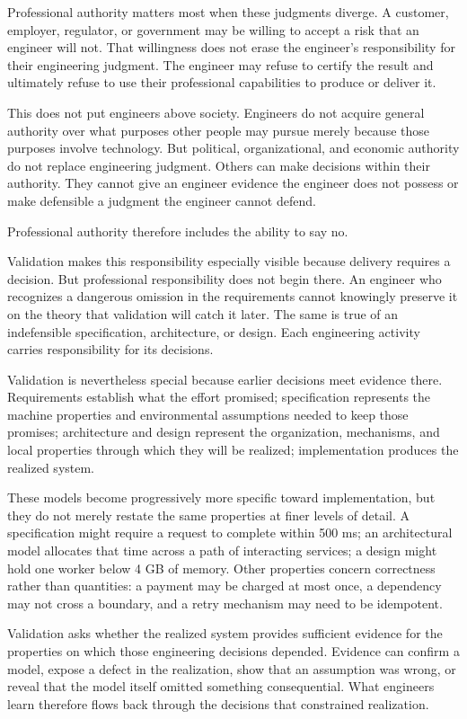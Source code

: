 Professional authority matters most when these judgments diverge. A customer, employer, regulator,
or government may be willing to accept a risk that an engineer will not. That willingness does not
erase the engineer's responsibility for their engineering judgment. The engineer may refuse to
certify the result and ultimately refuse to use their professional capabilities to produce or
deliver it.

This does not put engineers above society. Engineers do not acquire general authority over what
purposes other people may pursue merely because those purposes involve technology. But political,
organizational, and economic authority do not replace engineering judgment. Others can make
decisions within their authority. They cannot give an engineer evidence the engineer does not
possess or make defensible a judgment the engineer cannot defend.

Professional authority therefore includes the ability to say no.

Validation makes this responsibility especially visible because delivery requires a decision. But
professional responsibility does not begin there. An engineer who recognizes a dangerous omission
in the requirements cannot knowingly preserve it on the theory that validation will catch it later.
The same is true of an indefensible specification, architecture, or design. Each engineering
activity carries responsibility for its decisions.

Validation is nevertheless special because earlier decisions meet evidence there. Requirements
establish what the effort promised; specification represents the machine properties and
environmental assumptions needed to keep those promises; architecture and design represent the
organization, mechanisms, and local properties through which they will be realized; implementation
produces the realized system.

These models become progressively more specific toward implementation, but they do not merely
restate the same properties at finer levels of detail. A specification might require a request to
complete within 500 ms; an architectural model allocates that time across a path of interacting
services; a design might hold one worker below 4 GB of memory. Other properties concern correctness
rather than quantities: a payment may be charged at most once, a dependency may not cross a
boundary, and a retry mechanism may need to be idempotent.

Validation asks whether the realized system provides sufficient evidence for the properties on
which those engineering decisions depended. Evidence can confirm a model, expose a defect in the
realization, show that an assumption was wrong, or reveal that the model itself omitted something
consequential. What engineers learn therefore flows back through the decisions that constrained
realization.


